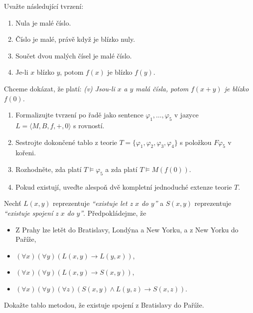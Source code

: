 \documentclass[a4paper,12pt]{article}
\begin{document}
\medskip\begin{problem}
Uvažte následující tvrzení:
\begin{enumerate}[label=(\roman*)] \it 
    \item Nula je malé číslo.
    \item Číslo je malé, právě když je blízko nuly.
    \item Součet dvou malých čísel je malé číslo.
    \item Je-li $x$ blízko $y$, potom $f(x)$ je blízko $f(y)$.
\end{enumerate}
Chceme dokázat, že platí: {\it (v) Jsou-li $x$ a $y$ malá čísla, potom $f(x+y)$ je blízko $f(0)$.}

\begin{enumerate}
\item Formalizujte tvrzení po řadě jako sentence $\varphi_1,\dots,\varphi_5$ v jazyce $L=\langle M,B,f,+,0\rangle$ s rovností.
\item Sestrojte dokončené tablo z teorie $T=\{\varphi_1,\varphi_2,\varphi_3,\varphi_4\}$ s položkou $F\varphi_5$ v kořeni.
\item Rozhodněte, zda platí $T\models \varphi_5$ a zda platí $T\models M(f(0))$.

\item Pokud existují, uveďte alespoň dvě kompletní jednoduché extenze teorie $T$.
\end{enumerate}
\end{problem}

    
\medskip\begin{problem} Nechť $L(x,y)$ reprezentuje \emph{``existuje let z $x$ do $y$''} a $S(x,y)$ reprezentuje \emph{``existuje spojení z $x$ do $y$''}. Předpokládejme, že
    \begin{itemize}  
    \item Z Prahy lze letět do Bratislavy, Londýna a New Yorku, a z New Yorku do Paříže,
    \item $(\forall x)(\forall y)(L(x,y) \to L(y,x))$,
    \item $(\forall x)(\forall y)(L(x,y)\to S(x,y))$,
    \item $(\forall x)(\forall y)(\forall z)(S(x,y)\wedge L(y,z)\to S(x,z))$.
    \end{itemize}
    Dokažte tablo metodou, že existuje spojení z Bratislavy do Paříže.
\end{problem}
\end{document}

